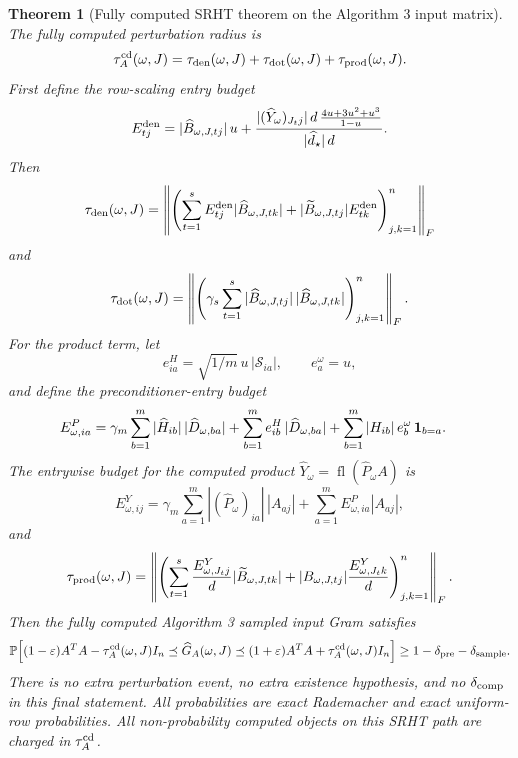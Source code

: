 \documentclass[11pt]{article}
\newcommand{\Prob}{\mathbb{P}}
\newcommand{\fl}{\operatorname{fl}}
\newcommand{\I}{I}
\newcommand{\eps}{\varepsilon}
\newtheorem{theorem}{Theorem}
\theoremstyle{remark}
\begin{document}
\begin{theorem}[Fully computed SRHT theorem on the Algorithm 3 input matrix]
The fully computed perturbation radius is
\[
  \tau_A^{\rm cd}(\omega,J)
  =
  \tau_{\rm den}(\omega,J)
  +
  \tau_{\rm dot}(\omega,J)
  +
  \tau_{\rm prod}(\omega,J).
\]
First define the row-scaling entry budget
\[
  E^{\rm den}_{tj}
  =
  |\widehat B_{\omega,J,tj}|\,u
  +
  \frac{|(\widehat Y_\omega)_{J_tj}|\,d\,
        \frac{4u+3u^2+u^3}{1-u}}
       {|\widehat d_\star|\,d}.
\]
Then
\[
  \tau_{\rm den}(\omega,J)
  =
  \left\|
    \left(
      \sum_{t=1}^s
      E^{\rm den}_{tj}|\widehat B_{\omega,J,tk}|
      +
      |\widetilde B_{\omega,J,tj}|E^{\rm den}_{tk}
    \right)_{j,k=1}^n
  \right\|_F
\]
and
\[
  \tau_{\rm dot}(\omega,J)
  =
  \left\|
    \left(
      \gamma_s
      \sum_{t=1}^s
      |\widehat B_{\omega,J,tj}|\,|\widehat B_{\omega,J,tk}|
    \right)_{j,k=1}^n
  \right\|_F .
\]
For the product term, let
\[
  e^H_{ia}=\sqrt{1/m}\,u\,|\mathcal S_{ia}|,
  \qquad
  e^\omega_a=u,
\]
and define the preconditioner-entry budget
\[
\begin{aligned}
  E^P_{\omega,ia}
  &=
  \gamma_m
  \sum_{b=1}^m |\widehat H_{ib}|\,
    |\widehat D_{\omega,ba}|
  +
  \sum_{b=1}^m e^H_{ib}\,|\widehat D_{\omega,ba}|
  +
  \sum_{b=1}^m |H_{ib}|\,e^\omega_b\,{\bf 1}_{b=a}.
\end{aligned}
\]
The entrywise budget for the computed product
\(\widehat Y_\omega=\fl(\widehat P_\omega A)\) is
\[
  E^Y_{\omega,ij}
  =
  \gamma_m\sum_{a=1}^m
    |(\widehat P_\omega)_{ia}|\,|A_{aj}|
  +
  \sum_{a=1}^m E^P_{\omega,ia}|A_{aj}|,
\]
and
\[
  \tau_{\rm prod}(\omega,J)
  =
  \left\|
    \left(
      \sum_{t=1}^s
      \frac{E^Y_{\omega,J_tj}}{d}
        |\widetilde B_{\omega,J,tk}|
      +
      |B_{\omega,J,tj}|
      \frac{E^Y_{\omega,J_tk}}{d}
    \right)_{j,k=1}^n
  \right\|_F .
\]
Then the fully computed Algorithm 3 sampled input Gram satisfies
\[
  \Prob\!\left[
    (1-\eps)A^TA-\tau_A^{\rm cd}(\omega,J)\I_n
    \preceq
    \widehat G_A(\omega,J)
    \preceq
    (1+\eps)A^TA+\tau_A^{\rm cd}(\omega,J)\I_n
  \right]
  \ge
  1-\delta_{\rm pre}-\delta_{\rm sample}.
\]
There is no extra perturbation event, no extra existence hypothesis, and no
\(\delta_{\rm comp}\) in this final statement.  All probabilities are exact
Rademacher and exact uniform-row probabilities.  All non-probability computed
objects on this SRHT path are charged in \(\tau_A^{\rm cd}\).
\end{theorem}
\end{document}

